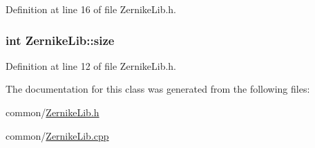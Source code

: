 Definition at line 16 of file ZernikeLib.h.

\hypertarget{classZernikeLib_aec67cc4b8888597848f0ef75a4d28adb}{
\subsubsection[{size}]{\setlength{\rightskip}{0pt plus 5cm}int {\bf ZernikeLib::size}}}
\label{classZernikeLib_aec67cc4b8888597848f0ef75a4d28adb}


Definition at line 12 of file ZernikeLib.h.



The documentation for this class was generated from the following files:\begin{DoxyCompactItemize}
\item 
common/\hyperlink{ZernikeLib_8h}{ZernikeLib.h}\item 
common/\hyperlink{ZernikeLib_8cpp}{ZernikeLib.cpp}\end{DoxyCompactItemize}
